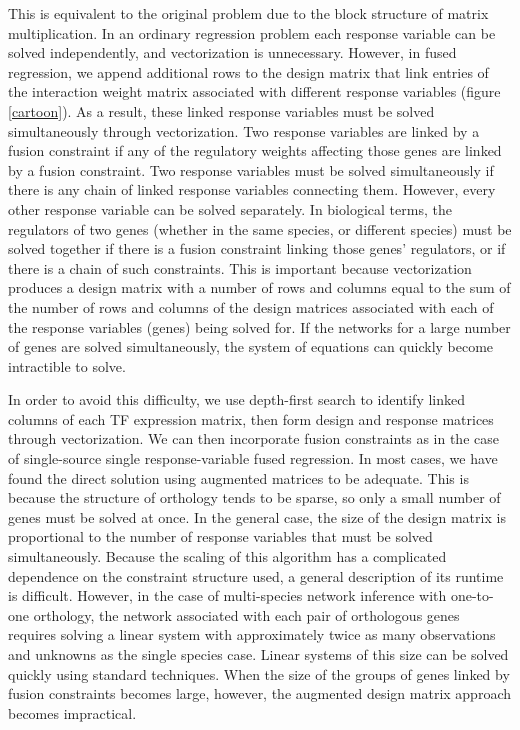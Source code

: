 \documentclass[11pt]{article}
\begin{document}

This is equivalent to the original problem due to the block structure of matrix multiplication. In an ordinary regression problem each response variable can be solved independently, and vectorization is unnecessary. However, in fused regression, we append additional rows to the design matrix that link entries of the interaction weight matrix associated with different response variables (figure \ref{cartoon}). As a result, these linked response variables must be solved simultaneously through vectorization. Two response variables are linked by a fusion constraint if any of the regulatory weights affecting those genes are linked by a fusion constraint. Two response variables must be solved simultaneously if there is any chain of linked response variables connecting them. However, every other response variable can be solved separately. In biological terms, the regulators of two genes (whether in the same species, or different species) must be solved together if there is a fusion constraint linking those genes' regulators, or if there is a chain of such constraints. This is important because vectorization produces a design matrix with a number of rows and columns equal to the sum of the number of rows and columns of the design matrices associated with each of the response variables (genes) being solved for. If the networks for a large number of genes are solved simultaneously, the system of equations can quickly become intractible to solve. 

In order to avoid this difficulty, we use depth-first search to identify linked columns of each TF expression matrix, then form design and response matrices through vectorization. We can then incorporate fusion constraints as in the case of single-source single response-variable fused regression. In most cases, we have found the direct solution using augmented matrices to be adequate. This is because the structure of orthology tends to be sparse, so only a small number of genes must be solved at once. In the general case, the size of the design matrix is proportional to the number of response variables that must be solved simultaneously. Because the scaling of this algorithm has a complicated dependence on the constraint structure used, a general description of its runtime is difficult. However, in the case of multi-species network inference with one-to-one orthology, the network associated with each pair of orthologous genes requires solving a linear system with approximately twice as many observations and unknowns as the single species case. Linear systems of this size can be solved quickly using standard techniques. When the size of the groups of genes linked by fusion constraints becomes large, however, the augmented design matrix approach becomes impractical.
\end{document}
